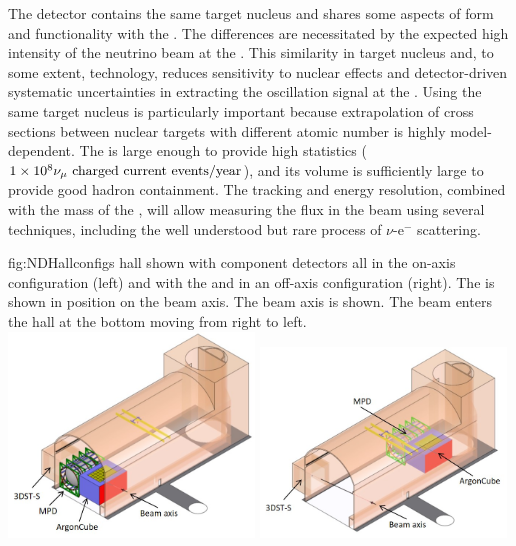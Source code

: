 The  detector contains the same target nucleus and shares some aspects of form and functionality with the . The differences are necessitated by the expected high intensity of the neutrino beam at the .  This similarity in target nucleus and, to some extent, technology, reduces sensitivity to nuclear effects and detector-driven systematic uncertainties in extracting the oscillation signal at the  . Using the same target nucleus is particularly important because extrapolation of cross sections between nuclear targets with different atomic number is highly model-dependent. The  is large enough to provide high statistics ($\num{1e8}{\numu \text{ charged current events/year}}$), and its volume is sufficiently large to provide good hadron containment.  The tracking and energy resolution, combined with the mass of the , will allow measuring the flux in the beam using several techniques, including the well understood but rare process of $\nu$-e$^{-}$ scattering.

\begin{dunefigure}
{fig:NDHallconfigs}
{  hall shown with component detectors all in the on-axis configuration (left) and with the  and  in an off-axis configuration (right). The  is shown in position on the beam axis. The beam axis is shown.  The beam enters the hall at the bottom moving from right to left.}
\includegraphics[width=0.49\textwidth]{graphics/NDHall_onaxis.jpg}
\includegraphics[width=0.49\textwidth]{graphics/NDHall_offaxis.jpg}
\end{dunefigure}

